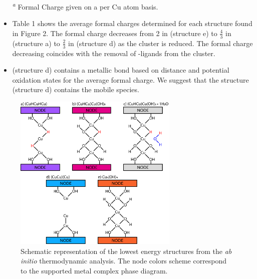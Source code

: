 \documentclass[12pt]{article}
\begin{document}
\begin{itemize}
\begin{table}[h]
        \textsuperscript{\emph{a}} Formal Charge given on a per Cu atom basis. \\
    \end{table} 
    \item Table 1 shows the average  formal charges determined for each structure found in Figure 2. The  formal charge decreases from 2 in  (structure e) to $\frac{4}{3}$ in  (structure a) to $\frac{2}{3}$ in  (structure d) as the cluster is reduced. The  formal charge decreasing coincides with the removal of -ligands from the cluster.
    \item {} (structure d) contains a metallic  bond based on  distance and potential  oxidation states for the average  formal charge. We suggest that the  structure (structure d) contains the mobile  species. 
\end{itemize}

\begin{figure}[H]
    \centering
    \includegraphics[width=0.70\textwidth]{zi-images/02-Cu-Graphics/2020-08-04-structure-diagram-Cu3OH4-V01-IMAGE.png}
    \caption{Schematic representation of the lowest energy structures from the \textit{ab initio} thermodynamic analysis. The node colors scheme correspond to the  supported metal complex phase diagram.}
    \label{fig:structurediagramCu3}
\end{figure}

\newpage
\end{document}
